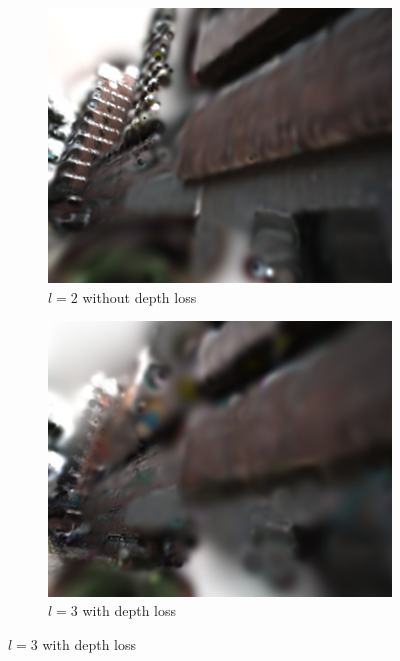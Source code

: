 \documentclass[lettersize,journal]{IEEEtran}
\begin{document}
\begin{figure}
    \raggedright %
    \begin{subfigure}{0.15\textwidth}
        \includegraphics[width=\linewidth]{image/ablation/wod.png}
        \caption{$l=2$ without depth loss}
        \label{fig:ablationwod}
    \end{subfigure}
    \hspace{0.0001\textwidth} %
    \begin{subfigure}{0.15\textwidth}
        \includegraphics[width=\linewidth]{image/ablation/wd3.png}
        \caption{$l=3$ with depth loss}

\end{subfigure}
\end{figure}
\end{document}
